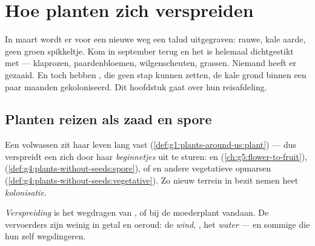 \chapter{Hoe planten zich verspreiden}\label{ch:g6:how-plants-spread}

In maart wordt er voor een nieuwe weg een talud uitgegraven: rauwe, kale
aarde, geen groen spikkeltje. Kom in september terug en het is helemaal
dichtgestikt met  --- klaprozen, paardenbloemen,
wilgenscheuten, grassen. Niemand heeft er gezaaid. En toch hebben
, die geen stap kunnen zetten, de kale grond binnen een paar
maanden gekoloniseerd. Dit hoofdstuk gaat over hun reisafdeling.

\section{Planten reizen als zaad en spore}

\begin{proposition}\label{prop:g6:how-plants-spread:travel}
Een volwassen  zit haar leven lang vast
(\cref{def:g1:plants-around-us:plant}) --- dus verspreidt een  zich
door haar \emph{beginnetjes} uit te sturen:  en 
(\cref{ch:g5:flower-to-fruit}), 
(\cref{def:g4:plants-without-seeds:spore}), of  en andere
vegetatieve opmarsen
(\cref{def:g4:plants-without-seeds:vegetative}). Zo nieuw terrein in
bezit nemen heet \emph{kolonisatie}.
\end{proposition}
\admitted

\begin{definition}[Verspreiding]\label{def:g6:how-plants-spread:dispersal}
\emph{Verspreiding} is het wegdragen van ,
 of  bij de moederplant vandaan. De vervoerders zijn weinig
in getal en oeroud: de \emph{wind}, \emph{}, het \emph{water} ---
en sommige  die hun  zelf wegslingeren.
\end{definition}


